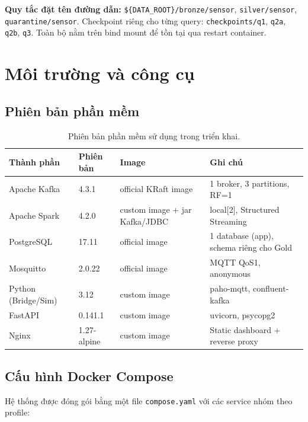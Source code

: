 \textbf{Quy tắc đặt tên đường dẫn:}
\texttt{\$\{DATA\_ROOT\}/bronze/sensor}, \texttt{silver/sensor},
\texttt{quarantine/sensor}. Checkpoint riêng cho từng query:
\texttt{checkpoints/q1}, \texttt{q2a}, \texttt{q2b}, \texttt{q3}. Toàn bộ nằm
trên bind mount để tồn tại qua restart container.

\section{Môi trường và công cụ}

\subsection{Phiên bản phần mềm}

\begin{table}[H]
\centering
\caption{Phiên bản phần mềm sử dụng trong triển khai.}
\label{tab:versions}
\small
\begin{tabularx}{\textwidth}{l l X X}
\toprule
\textbf{Thành phần} & \textbf{Phiên bản} & \textbf{Image} & \textbf{Ghi chú} \\
\midrule
Apache Kafka & 4.3.1 & official KRaft image & 1 broker, 3 partitions, RF=1~\cite{kafka_docs_4_3} \\
Apache Spark & 4.2.0 & custom image + jar Kafka/JDBC & local{[}2{]}, Structured Streaming~\cite{spark_docs_4_2} \\
PostgreSQL & 17.11 & official image & 1 database (app), schema riêng cho Gold \\
Mosquitto & 2.0.22 & official image & MQTT QoS1, anonymous \\
Python (Bridge/Sim) & 3.12 & custom image & paho-mqtt, confluent-kafka \\
FastAPI & 0.141.1 & custom image & uvicorn, psycopg2 \\
Nginx & 1.27-alpine & custom image & Static dashboard + reverse proxy \\
\bottomrule
\end{tabularx}
\end{table}

\subsection{Cấu hình Docker Compose}

Hệ thống được đóng gói bằng một file \texttt{compose.yaml} với các service
nhóm theo profile:

